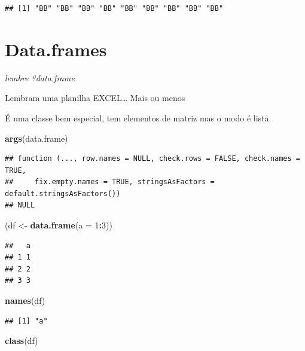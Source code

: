\documentclass[]{book}
\newenvironment{Shaded}{\begin{snugshade}}{\end{snugshade}}
\newcommand{\KeywordTok}[1]{\textcolor[rgb]{0.13,0.29,0.53}{\textbf{#1}}}
\newcommand{\DataTypeTok}[1]{\textcolor[rgb]{0.13,0.29,0.53}{#1}}
\newcommand{\DecValTok}[1]{\textcolor[rgb]{0.00,0.00,0.81}{#1}}
\newcommand{\StringTok}[1]{\textcolor[rgb]{0.31,0.60,0.02}{#1}}
\newcommand{\OperatorTok}[1]{\textcolor[rgb]{0.81,0.36,0.00}{\textbf{#1}}}
\newcommand{\NormalTok}[1]{#1}
\theoremstyle{definition}
\theoremstyle{definition}
\theoremstyle{definition}
\theoremstyle{remark}
\begin{document}
\begin{verbatim}
## [1] "BB" "BB" "BB" "BB" "BB" "BB" "BB" "BB" "BB"
\end{verbatim}

\section{Data.frames}\label{data.frames}

\emph{lembre ?data.frame}

Lembram uma planilha EXCEL\ldots{} Mais ou menos

É uma classe bem especial, tem elementos de matriz mas o modo é lista

\begin{Shaded}
\begin{Highlighting}[]
\KeywordTok{args}\NormalTok{(data.frame)}
\end{Highlighting}
\end{Shaded}

\begin{verbatim}
## function (..., row.names = NULL, check.rows = FALSE, check.names = TRUE, 
##     fix.empty.names = TRUE, stringsAsFactors = default.stringsAsFactors()) 
## NULL
\end{verbatim}

\begin{Shaded}
\begin{Highlighting}[]
\NormalTok{(df <-}\StringTok{ }\KeywordTok{data.frame}\NormalTok{(}\DataTypeTok{a =} \DecValTok{1}\OperatorTok{:}\DecValTok{3}\NormalTok{))}
\end{Highlighting}
\end{Shaded}

\begin{verbatim}
##   a
## 1 1
## 2 2
## 3 3
\end{verbatim}

\begin{Shaded}
\begin{Highlighting}[]
\KeywordTok{names}\NormalTok{(df)}
\end{Highlighting}
\end{Shaded}

\begin{verbatim}
## [1] "a"
\end{verbatim}

\begin{Shaded}
\begin{Highlighting}[]
\KeywordTok{class}\NormalTok{(df)}
\end{Highlighting}
\end{Shaded}
\end{document}
